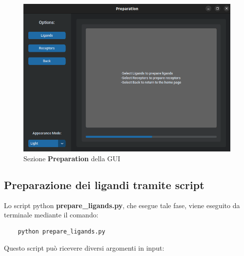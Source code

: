 \begin{figure}[H]
    \centering
    \includegraphics[scale=0.6]{immagini/preparation.png}
    \caption{Sezione \textbf{Preparation} della GUI}
    \label{fig:preparation}
\end{figure}

\subsection{Preparazione dei ligandi tramite script} \label{Preparazione dei ligandi script}
Lo script python \textbf{prepare\_ligands.py}, che esegue tale fase, viene eseguito da terminale mediante il comando:

\begin{verbatim}
    python prepare_ligands.py
\end{verbatim}

Questo script può ricevere diversi argomenti in input:

